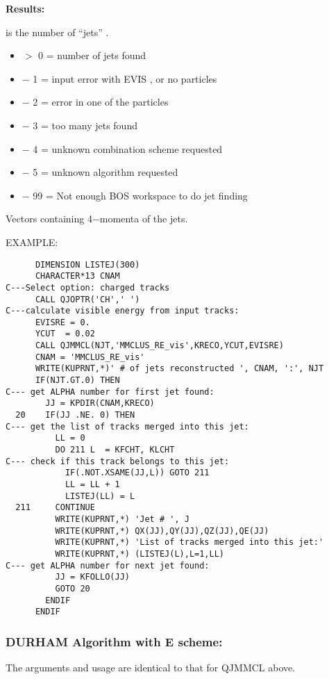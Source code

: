 {\bf Results:}
\begin{indentlist}{ 2.50cm}{ 2.75cm}
is the number of ``jets'' .
\begin{itemize}
\item  $>$ 0 = number of jets found
\item  $-$ 1 = input error with EVIS , or no particles
\item  $-$ 2 = error in one of the particles
\item  $-$ 3 = too many jets found
\item  $-$ 4 = unknown combination scheme requested
\item  $-$ 5 = unknown algorithm requested
\item  $-$ 99 = Not enough BOS workspace to do jet finding
\end{itemize}
Vectors containing 4$-$momenta of the jets.
\end{indentlist}
\par
EXAMPLE:
\begin{verbatim}
      DIMENSION LISTEJ(300)
      CHARACTER*13 CNAM
C---Select option: charged tracks
      CALL QJOPTR('CH',' ')
C---calculate visible energy from input tracks:
      EVISRE = 0.
      YCUT  = 0.02
      CALL QJMMCL(NJT,'MMCLUS_RE_vis',KRECO,YCUT,EVISRE)
      CNAM = 'MMCLUS_RE_vis'
      WRITE(KUPRNT,*)' # of jets reconstructed ', CNAM, ':', NJT
      IF(NJT.GT.0) THEN
C--- get ALPHA number for first jet found:
        JJ = KPDIR(CNAM,KRECO)
  20    IF(JJ .NE. 0) THEN
C--- get the list of tracks merged into this jet:
          LL = 0
          DO 211 L  = KFCHT, KLCHT
C--- check if this track belongs to this jet:
            IF(.NOT.XSAME(JJ,L)) GOTO 211
            LL = LL + 1
            LISTEJ(LL) = L
  211     CONTINUE
          WRITE(KUPRNT,*) 'Jet # ', J
          WRITE(KUPRNT,*) QX(JJ),QY(JJ),QZ(JJ),QE(JJ)
          WRITE(KUPRNT,*) 'List of tracks merged into this jet:'
          WRITE(KUPRNT,*) (LISTEJ(L),L=1,LL)
C--- get ALPHA number for next jet found:
          JJ = KFOLLO(JJ)
          GOTO 20
        ENDIF
      ENDIF
\end{verbatim}
 
 
\par
\subsubsection{\label{sec-QDMMCL}DURHAM Algorithm with E scheme:}
\par
{}
\par
 The arguments and usage are identical to that for QJMMCL above.
\par
 
